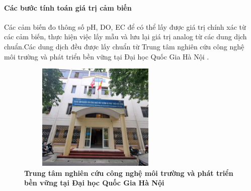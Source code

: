 \documentclass{article} %
\begin{document}
	\paragraph{Các bước tính toán giá trị cảm biến}\mbox{}
	
	Các cảm biến đo thông số pH, DO, EC để có thể lấy được giá trị chính xác từ các cảm biến,  thực hiện việc lấy mẫu và lưu lại giá trị analog từ các dung dịch chuẩn.Các dung dịch đều được lấy chuẩn từ Trung tâm nghiên cứu công nghệ môi trường và phát triển bền vững tại Đại học Quốc Gia Hà Nội \cite{VNU}.
	
	\begin{figure}[!ht]
		\centering
		\includegraphics[width=7.5cm,height=5.1cm]{Images/vnu.png}
		\caption[  Trung tâm nghiên cứu công nghệ môi trường và phát triển bền vững tại Đại học Quốc Gia Hà Nội\cite{VNU}]{\bfseries \fontsize{12pt}{0pt}\selectfont  Trung tâm nghiên cứu công nghệ môi trường và phát triển bền vững tại Đại học Quốc Gia Hà Nội\cite{VNU}}
		\label{vnu}
	\end{figure}
	\newpage
\end{document}
